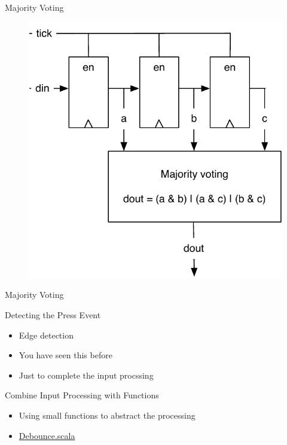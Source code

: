 \begin{frame}[fragile]{Majority Voting}
\begin{figure}
  \includegraphics[scale=\scale]{../figures/majority}
\end{figure}
\end{frame}


\begin{frame}[fragile]{Majority Voting}
\end{frame}

\begin{frame}[fragile]{Detecting the Press Event}
\begin{itemize}
\item Edge detection
\item You have seen this before
\item Just to complete the input procssing
\end{itemize}
\end{frame}

\begin{frame}[fragile]{Combine Input Processing with Functions}
\begin{itemize}
\item Using small functions to abstract the processing
\item \href{https://github.com/schoeberl/chisel-book/blob/master/src/main/scala/Debounce.scala}{Debounce.scala}
\end{itemize}
\end{frame}

